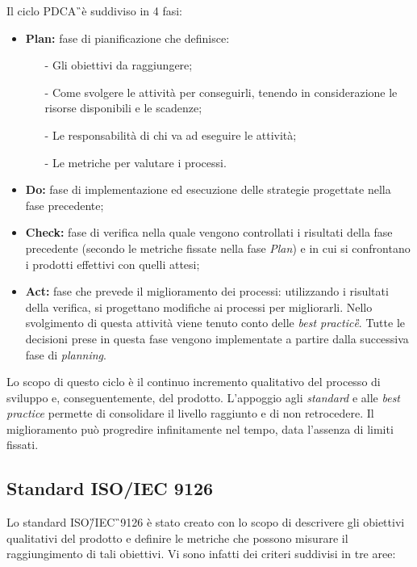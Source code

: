 Il ciclo PDCA\G\ è suddiviso in 4 fasi:

\begin{itemize}
	\item \textbf{Plan:} fase di pianificazione che definisce:
\begin{itemize}
	\item[-] Gli obiettivi da raggiungere;
	\item[-] Come svolgere le attività per conseguirli, tenendo in considerazione le risorse disponibili e le scadenze;
	\item[-] Le responsabilità di chi va ad eseguire le attività;
	\item[-] Le metriche per valutare i processi.
\end{itemize}
	
	\item \textbf{Do:} fase di implementazione ed esecuzione delle strategie progettate nella fase precedente;
	
	\item \textbf{Check:} fase di verifica nella quale vengono controllati i risultati della fase precedente (secondo le metriche fissate nella fase \textit{Plan}) e in cui si confrontano i prodotti effettivi con quelli attesi;
	
	\item \textbf{Act:} fase che prevede il miglioramento dei processi: utilizzando i risultati della verifica, si progettano modifiche ai processi per migliorarli. Nello svolgimento di questa attività viene tenuto conto delle \textit{best practice\G}. Tutte le decisioni prese in questa fase vengono implementate a partire dalla successiva fase di \textit{planning}.
\end{itemize}
Lo scopo di questo ciclo è il continuo incremento qualitativo del processo di sviluppo e, conseguentemente, del prodotto. L'appoggio agli \textit{standard} e alle \textit{best practice} permette di consolidare il livello raggiunto e di non retrocedere. Il miglioramento può progredire infinitamente nel tempo, data l'assenza di limiti fissati.

\subsection{Standard ISO/IEC 9126}

Lo standard ISO\G/IEC\G\ 9126 è stato creato con lo scopo di descrivere gli 
obiettivi qualitativi del prodotto e definire le metriche che possono misurare 
il raggiungimento di tali obiettivi. Vi sono infatti dei criteri suddivisi in tre 
aree:

